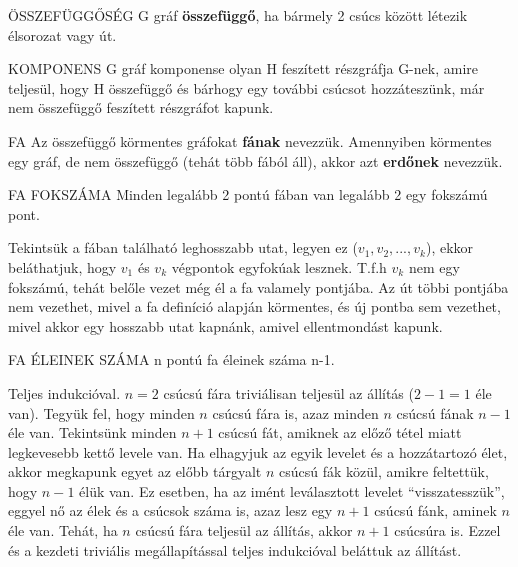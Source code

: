 \begin{definicio}{ÖSSZEFÜGGŐSÉG}
G gráf \textbf{összefüggő}, ha bármely 2 csúcs között létezik élsorozat vagy út.
\end{definicio}

\begin{definicio}{KOMPONENS}
G gráf komponense olyan H feszített részgráfja G-nek, amire teljesül, hogy H összefüggő és bárhogy egy további csúcsot hozzáteszünk, már nem összefüggő feszített részgráfot kapunk.
\end{definicio}

\begin{definicio}{FA}
Az összefüggő körmentes gráfokat \textbf{fának} nevezzük. Amennyiben körmentes egy gráf, de nem összefüggő (tehát több fából áll), akkor azt \textbf{erdőnek} nevezzük.
\end{definicio}

\begin{tetel}{FA FOKSZÁMA}
Minden legalább 2 pontú fában van legalább 2 egy fokszámú pont.
\end{tetel}

\begin{bizonyitas}{}
Tekintsük a fában található leghosszabb utat, legyen ez ($v_1, v_2,..., v_k$), ekkor beláthatjuk, hogy $v_1$ és $v_k$ végpontok egyfokúak lesznek. T.f.h $v_k$ nem egy fokszámú, tehát belőle vezet még él a fa valamely pontjába. Az út többi pontjába nem vezethet, mivel a fa definíció alapján körmentes, és új pontba sem vezethet, mivel akkor egy hosszabb utat kapnánk, amivel ellentmondást kapunk.
\end{bizonyitas}

\begin{tetel}{FA ÉLEINEK SZÁMA}
n pontú fa éleinek száma n-1.
\end{tetel}

\begin{bizonyitas}{}
  Teljes indukcióval. $n=2$ csúcsú fára triviálisan teljesül az állítás ($2-1=1$ éle van). Tegyük fel, hogy minden $n$ csúcsú fára is, azaz minden $n$ csúcsú fának $n-1$ éle van. Tekintsünk minden $n+1$ csúcsú fát, amiknek az előző tétel miatt legkevesebb kettő levele van. Ha elhagyjuk az egyik levelet és a hozzátartozó élet, akkor megkapunk egyet az előbb tárgyalt $n$ csúcsú fák közül, amikre feltettük, hogy $n-1$ élük van. Ez esetben, ha az imént leválasztott levelet ``visszatesszük'', eggyel nő az élek és a csúcsok száma is, azaz lesz egy $n+1$ csúcsú fánk, aminek $n$ éle van. Tehát, ha $n$ csúcsú fára teljesül az állítás, akkor $n+1$ csúcsúra is. Ezzel és a kezdeti triviális megállapítással teljes indukcióval beláttuk az állítást.
\end{bizonyitas}


